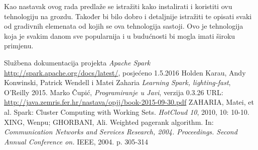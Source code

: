 \documentclass[times, utf8, zavrsni, numeric]{fer}
\begin{document}
Kao nastavak ovog rada predlaže se istražiti kako instalirati i koristiti ovu tehnologiju na grozdu. Također bi bilo dobro i detaljnije istražiti te opisati svaki od gradivnih elemenata od kojih se ova tehnologija sastoji. Ovo je tehnologija koja je svakim danom sve popularnija i u budućnosti bi mogla imati široku primjenu.

\begin{thebibliography}{9}
  Službena dokumentacija projekta \emph{Apache Spark} \url{http://spark.apache.org/docs/latest/}, posjećeno 1.5.2016
  Holden Karau, Andy Konwinski, Patrick Wendell i Matei Zaharia
  \emph{Learning Spark, lighting-fast}, O'Reilly 2015.
  Marko Čupić,
  \emph{Programiranje u Javi},
  verzija 0.3.26
  URL: \url{http://java.zemris.fer.hr/nastava/opjj/book-2015-09-30.pdf}
  ZAHARIA, Matei, et al. Spark: Cluster Computing with Working Sets. \emph{HotCloud 10}, 2010, 10: 10-10.
	XING, Wenpu; GHORBANI, Ali. Weighted pagerank algorithm. In: \emph{Communication Networks and Services Research, 2004. Proceedings. Second Annual Conference on.} IEEE, 2004. p. 305-314
\end{thebibliography}
\end{document}
